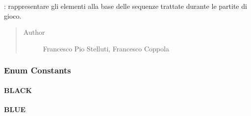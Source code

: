 \documentclass[letterpaper,10pt,italian,openany,oneside]{sphinxmanual}
\begin{document}
\begin{fulllineitems}
\label{\detokenize{source/it/unicam/cs/pa/mastermind/gamecore/ColorPegs:it.unicam.cs.pa.mastermind.gamecore.ColorPegs}}
: rappresentare gli elementi alla base delle sequenze trattate durante le partite di gioco.
\begin{quote}\begin{description}
\item[{Author}] \leavevmode
Francesco Pio Stelluti, Francesco Coppola

\end{description}\end{quote}

\end{fulllineitems}



\subsubsection{Enum Constants}
\label{\detokenize{source/it/unicam/cs/pa/mastermind/gamecore/ColorPegs:enum-constants}}

\paragraph{BLACK}
\label{\detokenize{source/it/unicam/cs/pa/mastermind/gamecore/ColorPegs:black}}

\begin{fulllineitems}
\label{\detokenize{source/it/unicam/cs/pa/mastermind/gamecore/ColorPegs:it.unicam.cs.pa.mastermind.gamecore.ColorPegs.BLACK}}
\end{fulllineitems}



\paragraph{BLUE}
\label{\detokenize{source/it/unicam/cs/pa/mastermind/gamecore/ColorPegs:blue}}

\begin{fulllineitems}
\label{\detokenize{source/it/unicam/cs/pa/mastermind/gamecore/ColorPegs:it.unicam.cs.pa.mastermind.gamecore.ColorPegs.BLUE}}
\end{fulllineitems}
\end{document}
